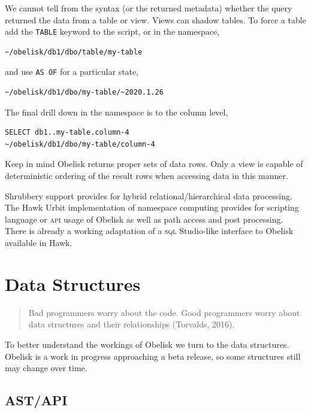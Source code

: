 \documentclass[twoside]{article}
\begin{document}
We cannot tell from the syntax (or the returned metadata) whether the query returned the data from a table or view. Views can shadow tables. To force a table add the \lstinline[style=inlinecode]{TABLE} keyword to the script, or in the namespace,

\begin{lstlisting}[style=listingcode_sql]
~/obelisk/db1/dbo/table/my-table
\end{lstlisting}

\noindent
and use \lstinline[style=inlinecode]{AS OF} for a particular state,

\begin{lstlisting}[style=listingcode_sql]
~/obelisk/db1/dbo/my-table/~2020.1.26
\end{lstlisting}

The final drill down in the namespace is to the column level,

\begin{lstlisting}[style=listingcode_sql]
SELECT db1..my-table.column-4
~/obelisk/db1/dbo/my-table/column-4
\end{lstlisting}
\noindent
Keep in mind Obelisk returns proper sets of data rows. Only a view is capable of deterministic ordering of the result rows when accessing data in this manner.

Shrubbery support provides for hybrid relational/hierarchical data processing. The Hawk Urbit implementation of namespace computing provides for scripting language or \textsc{api} usage of Obelisk as well as path access and post processing. There is already a working adaptation of a \textsc{sql} Studio-like interface to Obelisk available in Hawk. 

\section{Data Structures}

\begin{quote}
Bad programmers worry about the code. Good programmers worry about data structures and their relationships (Torvalds, 2016).
\end{quote}

To better understand the workings of Obelisk we turn to the data structures. Obelisk is a work in progress approaching a beta release, so some structures still may change over time.

\subsection[\textsc{ast}/\textsc{api}]{AST/API}
\end{document}

